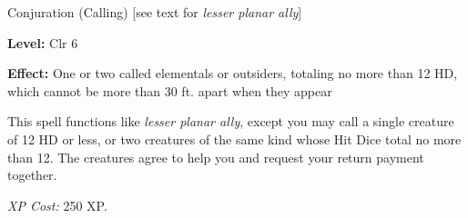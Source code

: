 
Conjuration (Calling) [see text for \textit{lesser planar ally}]

\textbf{Level:} Clr 6

\textbf{Effect:} One or two called elementals or outsiders, totaling no more than 
12 HD, which cannot be more than 30 ft. apart when they appear

This spell functions like \textit{lesser planar ally}, except you may call a single 
creature of 12 HD or less, or two creatures of the same kind whose Hit Dice total 
no more than 12. The creatures agree to help you and request your return payment 
together.

\textit{XP Cost:} 250 XP.

